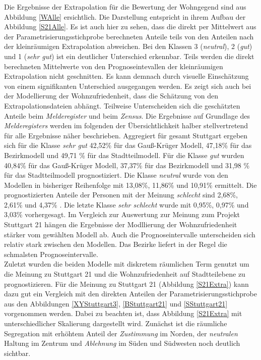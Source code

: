 \documentclass{Vorlage}
\begin{document}
Die Ergebnisse der Extrapolation für die Bewertung der Wohngegend sind aus Abbildung \ref{WAlle} ersichtlich. Die Darstellung entspricht in ihrem Aufbau der Abbildung \ref{S21Alle}. Es ist auch hier zu sehen, dass die direkt per Mittelwert aus der Parametrisierungsstichprobe berechneten Anteile teils von den Anteilen nach der kleinräumigen Extrapolation abweichen. Bei den Klassen 3 (\textit{neutral}), 2 (\textit{gut}) und 1 (\textit{sehr gut}) ist ein deutlicher Unterschied erkennbar.
Teils werden die direkt berechneten Mittelwerte von den Prognoseintevallen der kleinräumigen Extrapolation nicht geschnitten. Es kann demnach durch visuelle Einschätzung von einem signifikanten Unterschied ausgegangen werden. Es zeigt sich auch bei der Modellierung der Wohnzufriedenheit, dass die Schätzung von den Extrapolationsdateien abhängt. Teilweise Unterscheiden sich die geschätzten Anteile beim \textit{Melderegister} und beim \textit{Zensus}. Die Ergebnisse auf Grundlage des \textit{Melderegisters} werden im folgenden der Übersichtlichkeit halber stellvertretend für alle Ergebnisse näher beschrieben. Aggregiert für gesamt Stuttgart ergeben sich für die Klasse \textit{sehr gut} 42,52\% für das Gauß-Krüger Modell, 47,18\% für das Bezirkmodell und 49,71 \% für das Stadtteilmodell. Für die Klasse \textit{gut} wurden 40,84\% für das Gauß-Krüger Modell, 37,37\% für das Bezirkmodell und 31,98 \% für das Stadtteilmodell prognostiziert. Die Klasse \textit{neutral} wurde von den Modellen in bisheriger Reihenfolge mit 13,08\%, 11,86\% und 10,91\% ermittelt. Die prognostizierten Anteile der Personen mit der Meinung \textit{schlecht}  sind 2,68\%, 2,61\% und 4,37\% . Die letzte Klasse \textit{sehr schlecht} wurde mit 0,95\%, 0,97\% und 3,03\% vorhergesagt. Im Vergleich zur Auswertung zur Meinung zum Projekt Stuttgart 21 hängen die Ergebnisse der Modllierung der Wohnzufriedenheit stärker vom gewählten Modell ab. Auch die Prognoseintervalle unterscheiden sich relativ stark zwischen den Modellen. Das Bezirke liefert in der Regel die schmalsten Prognoseintervalle.\\
Zuletzt wurden die beiden Modelle mit diskretem räumlichen Term genutzt um die Meinung zu Stuttgart 21 und die Wohnzufriedenheit auf Stadtteilebene zu prognostizieren. Für die Meinung zu Stuttgart 21 (Abbildung \ref{S21Extra}) kann dazu gut ein Vergleich mit den direkten Anteilen der Parametrisierungsstichprobe aus den Abbildungen \ref{XYStuttgart3}, \ref{BStuttgart21} und \ref{SStuttgart21} vorgenommen werden. Dabei zu beachten ist, dass Abbildung \ref{S21Extra} mit unterschiedlicher Skalierung dargestellt wird. Zunächst ist die räumliche Segregation mit erhöhtem Anteil der \textit{Zustimmung} im Norden, der \textit{neutralen} Haltung im Zentrum und \textit{Ablehnung} im Süden und Südwesten noch deutlich sichtbar.
\end{document}
